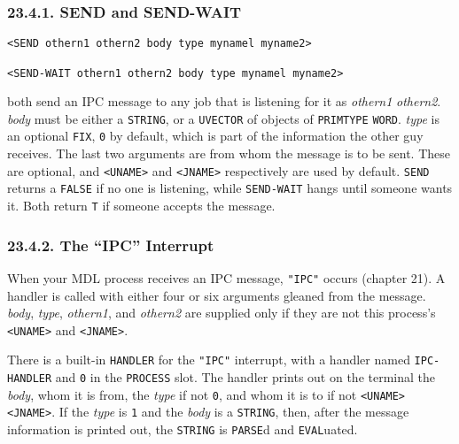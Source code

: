 \documentclass[a4paper,]{article}
\begin{document}
\subsubsection{23.4.1. SEND and SEND-WAIT}\label{send-and-send-wait}

\begin{verbatim}
<SEND othern1 othern2 body type mynamel myname2>

<SEND-WAIT othern1 othern2 body type mynamel myname2>
\end{verbatim}

 both send an IPC message to any job that is listening for it as \emph{othern1} \emph{othern2}.
\emph{body} must be either a \texttt{STRING}, or a \texttt{UVECTOR} of objects of \texttt{PRIMTYPE} \texttt{WORD}.
\emph{type} is an optional \texttt{FIX}, \texttt{0} by default, which is part of the information the other guy receives.
The last two arguments are from whom the message is to be sent. These are optional, and
\texttt{\textless{}UNAME\textgreater{}} and \texttt{\textless{}JNAME\textgreater{}} respectively are used by default.
\texttt{SEND} returns a \texttt{FALSE} if no one is listening, while \texttt{SEND-WAIT}
hangs until someone wants it. Both return \texttt{T} if someone accepts the message.

\subsubsection{\texorpdfstring{23.4.2. The ``IPC'' Interrupt}{23.4.2. The IPC Interrupt}}\label{the-ipc-interrupt}

When your MDL process receives an IPC message, \texttt{"IPC"}  occurs (chapter 21). A
handler is called with either four or six arguments gleaned from the message. \emph{body}, \emph{type}, \emph{othern1}, and
\emph{othern2} are supplied only if they are not this process's \texttt{\textless{}UNAME\textgreater{}} and
\texttt{\textless{}JNAME\textgreater{}}.

There is a built-in \texttt{HANDLER} for the \texttt{"IPC"} interrupt, with a handler named
\texttt{IPC-HANDLER} and \texttt{0} in the \texttt{PROCESS} slot. The handler prints out
on the terminal the \emph{body}, whom it is from, the \emph{type} if not \texttt{0}, and whom it is to if not
\texttt{\textless{}UNAME\textgreater{}} \texttt{\textless{}JNAME\textgreater{}}. If the \emph{type} is \texttt{1} and the
\emph{body} is a \texttt{STRING}, then, after the message information is printed out, the \texttt{STRING} is
\texttt{PARSE}d and \texttt{EVAL}uated.
\end{document}
